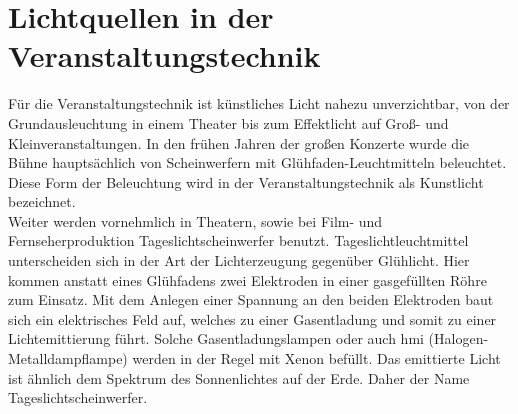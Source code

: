 \documentclass[11pt]{scrartcl}
\begin{document}
\section{Lichtquellen in der Veranstaltungstechnik}
Für die Veranstaltungstechnik ist künstliches Licht nahezu unverzichtbar, von der Grundausleuchtung in einem Theater bis zum Effektlicht
auf Groß- und Kleinveranstaltungen. In den frühen Jahren der großen Konzerte wurde die Bühne hauptsächlich von Scheinwerfern mit
Glühfaden-Leuchtmitteln beleuchtet. Diese Form der Beleuchtung wird in der Veranstaltungstechnik als Kunstlicht bezeichnet.\\
Weiter werden vornehmlich in Theatern, sowie bei Film- und Fernseherproduktion Tageslichtscheinwerfer benutzt. Tageslichtleuchtmittel
unterscheiden sich in der Art der Lichterzeugung gegenüber Glühlicht. Hier kommen anstatt eines Glühfadens zwei Elektroden in einer
gasgefüllten Röhre zum Einsatz. Mit dem Anlegen einer Spannung an den beiden Elektroden baut sich ein elektrisches Feld auf, welches zu
einer Gasentladung und somit zu einer Lichtemittierung führt. Solche Gasentladungslampen oder auch \ac{hmi} (Halogen-Metalldampflampe)
werden in der Regel mit Xenon befüllt. Das emittierte Licht ist ähnlich dem Spektrum des Sonnenlichtes auf der
Erde. Daher der Name Tageslichtscheinwerfer.
\end{document}
